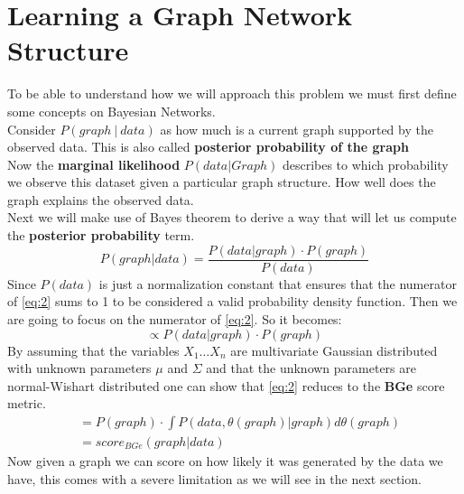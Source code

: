 \documentclass{article}
\begin{document}
	\section{Learning a Graph Network Structure}
	To be able to understand how we will approach this problem we must first
	define some concepts on Bayesian Networks. 
	\\	
	Consider $P(graph \ | \ data)$
	as how much is a current graph supported by the observed data. This is also
	called \textbf{posterior probability of the graph}
	\\
	Now the \textbf{marginal likelihood} $P(data|Graph)$ describes to which
	probability we observe this dataset given a particular graph
	structure. How well does the graph explains the observed data.
	\\
	Next we will make use of Bayes theorem to derive a way that will let us
	compute the \textbf{posterior probability} term.
	\begin{equation}
		P(graph | data) = \frac{P(data|graph) \cdot P(graph)}{P(data)} 
		\label{eq:2}
	\end{equation}
	Since $P(data)$ is just a normalization constant that ensures that the
	numerator of \eqref{eq:2} sums to 1 to be considered a valid probability
	density function. Then we are going to focus on the numerator of
	\eqref{eq:2}. So it becomes:
	\begin{equation}
		\propto P(data|graph) \cdot P(graph)
		\label{eq:3}
	\end{equation}
	By assuming that the variables $X_{1} \dots X_{n}$ are multivariate Gaussian
	distributed with unknown parameters $\mu$ and $\Sigma$ and that the unknown
	parameters are normal-Wishart distributed one can show that \eqref{eq:2}
	reduces to the \textbf{BGe} score metric. \cite{Lecture5}
	\begin{equation}
		\begin{aligned}
		 & =P(graph) \cdot \int P(data,\theta(graph) | graph) d\theta(graph) \\	
		 & =score_{BGe}(graph|data)
		\end{aligned}
		\label{eq:4}
	\end{equation}
	Now given a graph we can score on how likely it was generated by the data we
	have, this comes with a severe limitation as we will see in the next section.   
\end{document}
